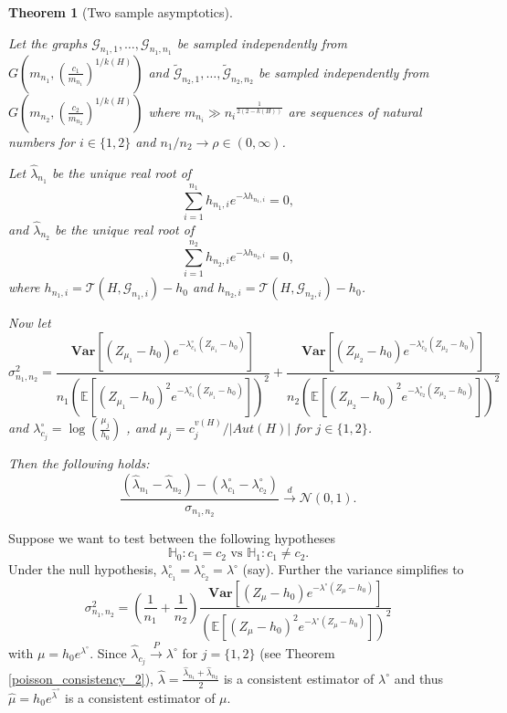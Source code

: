 \documentclass[12pt]{article}
\def\H{\mathbb{H}}
\numberwithin{equation}{section}
\newtheorem{theorem}{Theorem}[section]
\begin{document}
\begin{theorem}[Two sample asymptotics]{\label{two_sample_asymptotics}}

Let the graphs $\mathcal{G}_{{n_1},1}, \ldots, \mathcal{G}_{{n_1},{n_1}}$ be sampled independently from $G\left(m_{n_1}, (\frac{c_1}{m_{n_1}})^{1/k(H)}\right)$ and $\tilde{\mathcal{G}}_{n_2,1}, \ldots, \tilde{\mathcal{G}}_{n_2,n_2}$ be sampled independently from $G\left(m_{n_2}, (\frac{c_2}{m_{n_2}})^{1/k(H)}\right)$ where \(m_{n_i}\gg{n_i}^{\frac{1}{2(2-k(H))}}\) are sequences of natural numbers for $i \in \{1,2\}$ and $n_1/n_2 \to \rho \in (0, \infty)$.

Let $\hat{\lambda}_{n_1}$ be the unique real root of
\[
\sum_{i=1}^{n_1} h_{n_1,i} e^{-\lambda h_{n_1,i}} = 0,
\] and $\hat{\lambda}_{n_2}$ be the unique real root of
\[
\sum_{i=1}^{n_2} h_{n_2,i} e^{-\lambda h_{n_2,i}} = 0,
\]
where  \(h_{n_1,i}=\mathcal{T}(H,\mathcal{G}_{n_1,i})-h_0\) and  \(h_{n_2,i}=\mathcal{T}(H,\mathcal{G}_{n_2,i})-h_0\). 

Now let 
 \[\sigma^2_{n_1,n_2}=\frac{\mathbf{Var}\left[(Z_{\mu_1}-h_0)e^{-\lambda_{c_1}^{\circ}(Z_{\mu_1}-h_0)}\right]}{n_1\left(\mathbb{E}\left[(Z_{\mu_1}-h_0)^2e^{-\lambda_{c_1}^{\circ}(Z_{\mu_1}-h_0)}\right]\right)^2}+\frac{\mathbf{Var}\left[(Z_{\mu_2}-h_0)e^{-\lambda_{c_2}^{\circ}(Z_{\mu_2}-h_0)}\right]}{n_2\left(\mathbb{E}\left[(Z_{\mu_2}-h_0)^2e^{-\lambda_{c_2}^{\circ}(Z_{\mu_2}-h_0)}\right]\right)^2}
\]
and
 \(\lambda^{\circ}_{c_j}= \log\left(\frac{\mu_j}{h_0}\right)\) , and $\mu_j=c_j^{v(H)}/\lvert Aut(H)\rvert$ for $j\in\{1,2\}$.

Then the following holds: 
\[\frac{(\hat{\lambda}_{n_1} - \hat{\lambda}_{n_2})-(\lambda^{\circ}_{c_1}-\lambda^{\circ}_{c_2})}{\sigma_{n_1,n_2}}\xrightarrow{{d}} \mathcal{N}(0,1).\]
\end{theorem}
Suppose we want to test between the following hypotheses
\begin{equation*}
\H_0: c_1=c_2 \text{ vs } \H_1: c_1 \neq c_2. 
\end{equation*}
Under the null hypothesis, $\lambda^{\circ}_{c_1}=\lambda^{\circ}_{c_2}=\lambda^{\circ}$ (say). 
Further the variance simplifies to 
\[\sigma^2_{n_1,n_2}=\left(\frac{1}{n_1}+\frac{1}{n_2}\right)\frac{\mathbf{Var}\left[(Z_{\mu}-h_0)e^{-\lambda^{\circ}(Z_{\mu}-h_0)}\right]}{\left(\mathbb{E}\left[(Z_{\mu}-h_0)^2e^{-\lambda^{\circ}(Z_{\mu}-h_0)}\right]\right)^2}
\]
with $\mu=h_0e^{\lambda^{\circ}}$. Since $\hat{\lambda}_{c_j}\xrightarrow{P}\lambda^{\circ}$ for $j=\{1,2\}$ (see Theorem \ref{poisson_consistency_2}), $\hat{\lambda}=\frac{\hat{\lambda}_{n_1}+\hat{\lambda}_{n_2}}{2}$ is a consistent estimator of $\lambda^{\circ}$ and thus 
$\hat{\mu}=h_0e^{\hat{\lambda}^{\circ}}$ is a consistent estimator of $\mu$.
\end{document}
